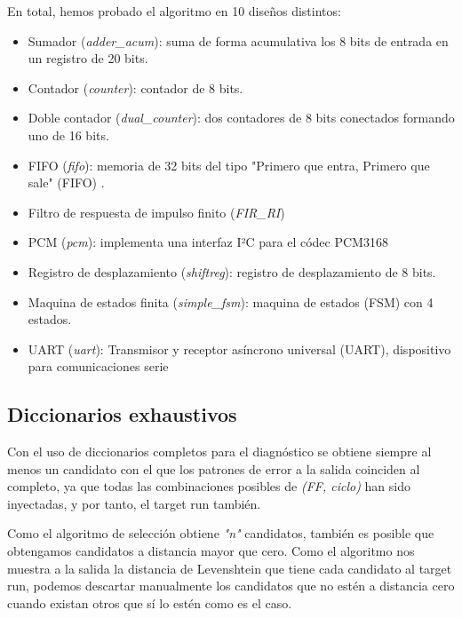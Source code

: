 En total, hemos probado el algoritmo en 10 diseños distintos:
\begin{itemize}
    \item Sumador (\textit{adder\_acum}): suma de forma acumulativa los 8 bits de 
        entrada en un registro de 20 bits.
    \item Contador (\textit{counter}): contador de 8 bits.
    \item Doble contador (\textit{dual\_counter}): dos contadores de 8 bits
        conectados formando uno de 16 bits.
    \item FIFO (\textit{fifo}): memoria de 32 bits del tipo "Primero que entra,
        Primero que sale" (\gls{FIFO}) \cite{FIFO}.
    \item Filtro de respuesta de impulso finito (\textit{FIR\_RI}) \cite{FIR}
    \item PCM (\textit{pcm}): implementa una interfaz I²C para el códec PCM3168
        \cite{PCM}
    \item Registro de desplazamiento (\textit{shiftreg}): registro de
        desplazamiento de 8 bits.
    \item Maquina de estados finita (\textit{simple\_fsm}): maquina de estados
        (\gls{FSM}) con 4 estados.
    \item UART (\textit{uart}): Transmisor y receptor asíncrono universal
        (\gls{UART}), dispositivo para comunicaciones serie \cite{UART}
\end{itemize}

\subsection{Diccionarios exhaustivos}
\label{subsec:LevDicExhaust}
Con el uso de diccionarios completos para el diagnóstico se obtiene siempre al 
menos un candidato con el que los patrones de error a la salida coinciden al
completo, ya que todas las combinaciones posibles de \textit{(\gls{FF}, ciclo)}
han sido inyectadas, y por tanto, el target run también.

Como el algoritmo de selección obtiene \textit{"n"} candidatos, también es posible
que obtengamos candidatos a distancia mayor que cero. Como el algoritmo nos
muestra a la salida la distancia de Levenshtein que tiene cada candidato al target
run, podemos descartar manualmente los candidatos que no estén a distancia cero
cuando existan otros que sí lo estén como es el caso.


